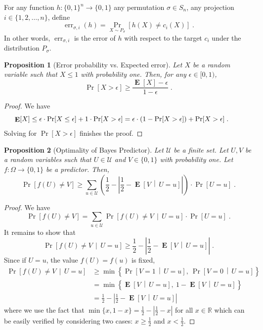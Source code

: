 \documentclass[10pt]{article}
\newtheorem{proposition}{Proposition}
\newcommand{\R}{\mathbb{R}}
\DeclareMathOperator{\err}{err}
\DeclareMathOperator{\Exp}{\mathbf{E}}
\begin{document}
For any function $h:\{0,1\}^n \to \{0,1\}$ any permutation $\sigma \in S_n$, any
projection $i \in \{1,2,\dots,n\}$, define
$$
\err_{\sigma,i}(h) = \Pr_{X \sim P_{\sigma}}[h(X) \neq c_i(X)] \; .
$$
In other words, $\err_{\sigma,i}$ is the error of $h$ with respect to the target
$c_i$ under the distribution $P_{\sigma}$.

\begin{proposition}[Error probability vs. Expected error]
Let $X$ be a random variable such that $X \le 1$ with probability one.
Then, for any $\epsilon \in [0, 1)$,
$$
\Pr[X > \epsilon] \ge \frac{\Exp[X] - \epsilon}{1 - \epsilon} \; .
$$
\end{proposition}

\begin{proof}
We have
$$
\Exp[X]
\le \epsilon \cdot \Pr[X \le \epsilon] + 1 \cdot \Pr[X > \epsilon]
= \epsilon \cdot (1 - \Pr[X > \epsilon]) + \Pr[X > \epsilon] \; .  \qquad \qedhere
$$
Solving for $\Pr[X > \epsilon]$ finishes the proof.
\end{proof}

\begin{proposition}[Optimality of Bayes Predictor]
Let $\mathcal{U}$ be a finite set. Let $U,V$ be a random variables such that $U \in \mathcal{U}$ and $V \in \{0,1\}$ with probability one.
Let $f:\Omega \to \{0,1\}$ be a predictor. Then,
$$
\Pr\left[ f(U) \neq V \right]
\ge \sum_{u \in \mathcal{U}} \left( \frac{1}{2} - \left| \frac{1}{2} -  \Exp \left[V \, \middle| \, U = u\right] \right| \right) \cdot \Pr[U = u] \; .
$$
\end{proposition}

\begin{proof}
We have
$$
\Pr \left[ f(U) \neq V \right] = \sum_{u \in \mathcal{U}} \Pr \left[ f(U) \neq V \, \middle| \, U = u \right] \cdot \Pr[U = u] \; .
$$
It remains to show that
$$
\Pr\left[ f(U) \neq V \, \middle| \, U = u \right]
\ge
\frac{1}{2} - \left| \frac{1}{2} -  \Exp \left[V \, \middle| \, U = u \right] \right| \; .
$$
Since if  $U=u$, the value $f(U) = f(u)$ is fixed,
\begin{align*}
\Pr\left[ f(U) \neq V \, \middle| \, U = u \right]
& \ge \min\left\{ \Pr \left[ V = 1 \, \middle| \, U = u \right], \ \Pr \left[ V = 0 \, \middle| \, U = u \right] \right\} \\
& = \min\left\{ \Exp \left[ V  \, \middle| \, U = u \right], \ 1 - \Exp \left[ V \, \middle| \, U = u \right] \right\} \\
& = \frac{1}{2} - \left| \frac{1}{2} -  \Exp \left[ V  \, \middle| \, U = u \right] \right|
\end{align*}
where we use the fact that $\min\{x, 1 - x\} = \frac{1}{2} - \left| \frac{1}{2} - x \right|$ for all $x \in \R$
which can be easily verified by considering two cases: $x \ge \frac{1}{2}$ and $x < \frac{1}{2}$.
\end{proof}
\end{document}
